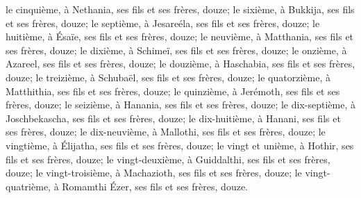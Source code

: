 \verse le cinquième, à Nethania, ses fils et ses frères, douze; 
\verse le sixième, à Bukkija, ses fils et ses frères, douze; 
\verse le septième, à Jesareéla, ses fils et ses frères, douze; 
\verse le huitième, à Ésaïe, ses fils et ses frères, douze; 
\verse le neuvième, à Matthania, ses fils et ses frères, douze; 
\verse le dixième, à Schimeï, ses fils et ses frères, douze; 
\verse le onzième, à Azareel, ses fils et ses frères, douze; 
\verse le douzième, à Haschabia, ses fils et ses frères, douze; 
\verse le treizième, à Schubaël, ses fils et ses frères, douze; 
\verse le quatorzième, à Matthithia, ses fils et ses frères, douze; 
\verse le quinzième, à Jerémoth, ses fils et ses frères, douze; 
\verse le seizième, à Hanania, ses fils et ses frères, douze; 
\verse le dix-septième, à Joschbekascha, ses fils et ses frères, douze; 
\verse le dix-huitième, à Hanani, ses fils et ses frères, douze; 
\verse le dix-neuvième, à Mallothi, ses fils et ses frères, douze; 
\verse le vingtième, à Élijatha, ses fils et ses frères, douze; 
\verse le vingt et unième, à Hothir, ses fils et ses frères, douze; 
\verse le vingt-deuxième, à Guiddalthi, ses fils et ses frères, douze; 
\verse le vingt-troisième, à Machazioth, ses fils et ses frères, douze; 
\verse le vingt-quatrième, à Romamthi Ézer, ses fils et ses frères, douze. 

